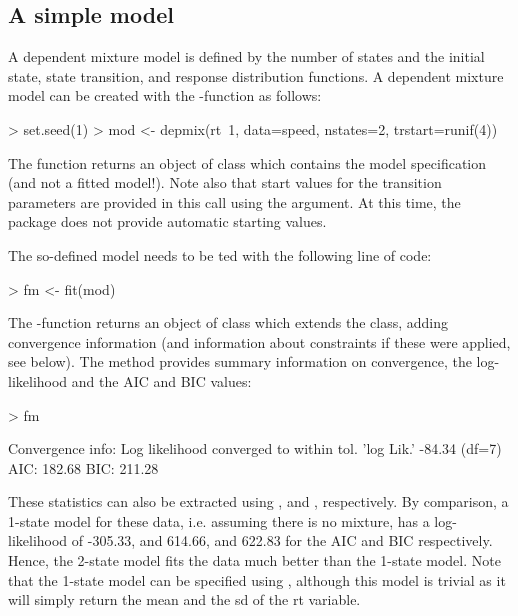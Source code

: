 \documentclass[article]{jss}
\begin{document}
\subsection{A simple model}

A dependent mixture model is defined by the number of states and the
initial state, state transition, and response distribution functions.
A dependent mixture model can be created with the
-function as follows:

\begin{CodeChunk}
\begin{CodeInput}
> set.seed(1)
> mod <- depmix(rt~1, data=speed, nstates=2, trstart=runif(4))
\end{CodeInput}
\end{CodeChunk}

The  function returns an object of class 
which contains the model specification (and not a fitted model!).
Note also that start values for the transition parameters are provided
in this call using the  argument.  At this time, the
package does not provide automatic starting values.

The so-defined model needs to be ted with the following
line of code:
\begin{CodeChunk}
\begin{CodeInput}
> fm <- fit(mod)
\end{CodeInput}
\end{CodeChunk}

The -function returns an object of class
 which extends the  class, adding
convergence information (and information about constraints if these
were applied, see below).  The  method provides summary
information on convergence, the log-likelihood and the AIC and BIC
values:
\begin{CodeChunk}
\begin{CodeInput}
> fm
\end{CodeInput}
\begin{CodeOutput}
Convergence info: Log likelihood converged to within tol. 
'log Lik.' -84.34 (df=7)
AIC:  182.68 
BIC:  211.28 
\end{CodeOutput}
\end{CodeChunk}
These statistics can also be extracted using , 
and , respectively.  By comparison, a 1-state model for
these data, i.e. assuming there is no mixture, has a log-likelihood of
-305.33, and 614.66, and 622.83 for the AIC and BIC respectively.
Hence, the 2-state model fits the data much better than the 1-state
model.  Note that the 1-state model can be specified using , although this model is trivial
as it will simply return the mean and the sd of the rt variable.
\end{document}
